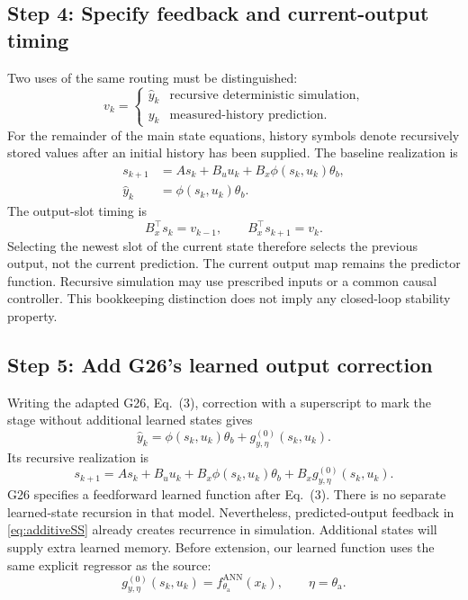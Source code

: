 \documentclass[11pt,a4paper]{article}
\begin{document}
\subsection*{Step 4: Specify feedback and current-output timing}
Two uses of the same routing must be distinguished:
\begin{equation}\label{eq:feedback}
v_k=\begin{cases}\hat y_k&\text{recursive deterministic simulation},\\y_k&\text{measured-history prediction}.\end{cases}
\end{equation}
For the remainder of the main state equations, history symbols denote recursively stored values after an initial history has been supplied. The baseline realization is
\begin{equation}\label{eq:baselineSS}
\boxed{\begin{aligned}
s_{k+1}&=As_k+B_u u_k+B_x\phi(s_k,u_k)\theta_b,\\
\hat y_k&=\phi(s_k,u_k)\theta_b.
\end{aligned}}
\end{equation}
The output-slot timing is
\begin{equation}\label{eq:selection}
B_x^\top s_k=v_{k-1},\qquad B_x^\top s_{k+1}=v_k.
\end{equation}
Selecting the newest slot of the current state therefore selects the previous output, not the current prediction. The current output map remains the predictor function.
Recursive simulation may use prescribed inputs or a common causal controller. This bookkeeping distinction does not imply any closed-loop stability property.

\subsection*{Step 5: Add G26's learned output correction}
Writing the adapted G26, Eq.\ (3), correction with a superscript to mark the stage without additional learned states gives
\begin{equation}\label{eq:additiveIO}
\hat y_k=\phi(s_k,u_k)\theta_b+g_{y,\eta}^{(0)}(s_k,u_k).
\end{equation}
Its recursive realization is
\begin{equation}\label{eq:additiveSS}
s_{k+1}=As_k+B_u u_k+B_x\phi(s_k,u_k)\theta_b
+B_xg_{y,\eta}^{(0)}(s_k,u_k).
\end{equation}
G26 specifies a feedforward learned function after Eq.\ (3). There is no separate learned-state recursion in that model. Nevertheless, predicted-output feedback in \eqref{eq:additiveSS} already creates recurrence in simulation. Additional states will supply extra learned memory.
Before extension, our learned function uses the same explicit regressor as the source:
\begin{equation}\label{eq:learnedmapping}
g_{y,\eta}^{(0)}(s_k,u_k)
=f_{\theta_{\mathrm a}}^{\mathrm{ANN}}(x_k),
\qquad \eta=\theta_{\mathrm a}.
\end{equation}
\end{document}
